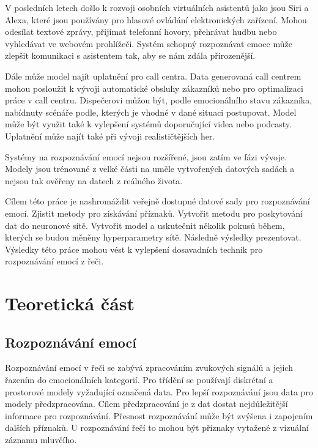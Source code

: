 \documentclass[FM,BP]{tulthesis}
\begin{document}
V posledních letech došlo k rozvoji osobních virtuálních asistentů jako jsou Siri a Alexa, které jsou používány pro hlasové ovládání elektronických zařízení. Mohou odesílat textové zprávy, přijímat telefonní hovory, přehrávat hudbu nebo vyhledávat ve webovém prohlížeči. Systém schopný rozpoznávat emoce může zlepšit komunikaci s asistentem tak, aby se nám zdála přirozenější.\cite{DBLP:journals/corr/abs-1912-10458} 

Dále může model najít uplatnění pro call centra. Data generovaná call centrem mohou posloužit k vývoji automatické obsluhy zákazníků nebo pro optimalizaci práce v call centru. Dispečerovi můžou být, podle emocionálního stavu zákazníka, nabídnuty scénáře podle, kterých je vhodné v dané situaci postupovat. Model může být využit také k vylepšení systémů doporučující videa nebo podcasty. Uplatnění může najít také při vývoji realističtějších her. \cite{konar_chakraborty_2015}

Systémy na rozpoznávání emocí nejsou rozšířené, jsou zatím ve fázi vývoje. Modely jsou trénované z velké části na uměle vytvořených datových sadách a nejsou tak ověřeny na datech z reálného života. \cite{konar_chakraborty_2015}

Cílem této práce je nashromáždit veřejně dostupné datové sady pro rozpoznávání emocí. Zjistit metody pro získávání příznaků. Vytvořit metodu pro poskytování dat do neuronové sítě. Vytvořit model a uskutečnit několik pokusů během, kterých se budou měněny hyperparametry sítě. Následně výsledky prezentovat. Výsledky této práce mohou vést k vylepšení dosavadních technik pro rozpoznávání emocí z řeči. 

\chapter{Teoretická část}
\section{Rozpoznávání emocí}
Rozpoznávání emocí v řeči se zabývá zpracováním zvukových signálů a jejich řazením do emocionálních kategorií. Pro třídění se používají diskrétní a prostorové modely vyžadující označená data. Pro lepší rozpoznávání jsou data pro modely předzpracována. Cílem předzpracování je z dat dostat nejdůležitější informace pro rozpoznávání. Přesnost rozpoznávání může být zvýšena i zapojením dalších příznaků. U rozpoznávání řečí to mohou být příznaky vytažené z vizuální záznamu mluvčího.\cite{DBLP:journals/speech/AkcayO20}
\end{document}
